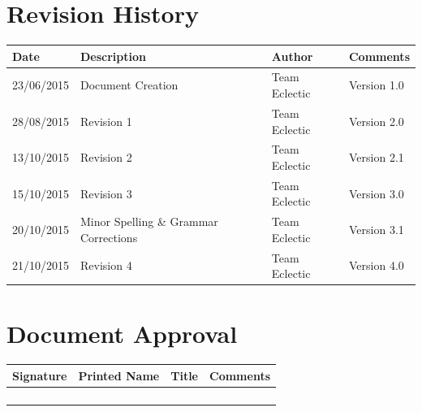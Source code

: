 \documentclass[11pt]{article}
\begin{document}


\setcounter{tocdepth}{3}
\setcounter{secnumdepth}{5}
\tableofcontents

\newpage
\section{Revision History}
\begin{table}[h]
\begin{tabular}{llll}
\textbf{Date}          & \textbf{Description}  & \textbf{Author}       & \textbf{Comments}   \\ \hline
\multicolumn{1}{|R{2cm}|}{23/06/2015} & \multicolumn{1}{L{4.5cm}|}{Document Creation} & \multicolumn{1}{l|}{Team Eclectic} & \multicolumn{1}{L{4cm}|}{Version 1.0} \\ \hline
\multicolumn{1}{|R{2cm}|}{28/08/2015} & \multicolumn{1}{L{4.5cm}|}{Revision 1} & \multicolumn{1}{l|}{Team Eclectic} & \multicolumn{1}{L{4cm}|}{Version 2.0} \\ \hline
\multicolumn{1}{|R{2cm}|}{13/10/2015} & \multicolumn{1}{L{4.5cm}|}{Revision 2} & \multicolumn{1}{l|}{Team Eclectic} & \multicolumn{1}{L{4cm}|}{Version 2.1} \\ \hline
\multicolumn{1}{|R{2cm}|}{15/10/2015} & \multicolumn{1}{L{4.5cm}|}{Revision 3} & \multicolumn{1}{l|}{Team Eclectic} & \multicolumn{1}{L{4cm}|}{Version 3.0} \\ \hline
\multicolumn{1}{|R{2cm}|}{20/10/2015} & \multicolumn{1}{L{4.5cm}|}{Minor Spelling \& Grammar Corrections} & \multicolumn{1}{l|}{Team Eclectic} & \multicolumn{1}{L{4cm}|}{Version 3.1} \\ \hline
\multicolumn{1}{|R{2cm}|}{21/10/2015} & \multicolumn{1}{L{4.5cm}|}{Revision 4} & \multicolumn{1}{l|}{Team Eclectic} & \multicolumn{1}{L{4cm}|}{Version 4.0} \\ \hline
\end{tabular}
\end{table}

\section{Document Approval}
\begin{table}[h]
\begin{tabular}{llll}
\textbf{Signature}     & \textbf{Printed Name} & \textbf{Title}        & \textbf{Comments}     \\ \hline
\multicolumn{1}{|l|}{} & \multicolumn{1}{L{3.5cm}|}{} & \multicolumn{1}{L{3.5cm}|}{} & \multicolumn{1}{L{4cm}|}{} \\ \hline
\multicolumn{1}{|l|}{} & \multicolumn{1}{l|}{} & \multicolumn{1}{l|}{} & \multicolumn{1}{l|}{} \\ \hline
\multicolumn{1}{|l|}{} & \multicolumn{1}{l|}{} & \multicolumn{1}{l|}{} & \multicolumn{1}{l|}{} \\ \hline
\multicolumn{1}{|l|}{} & \multicolumn{1}{l|}{} & \multicolumn{1}{l|}{} & \multicolumn{1}{l|}{} \\ \hline
\end{tabular}
\end{table}
\end{document}
